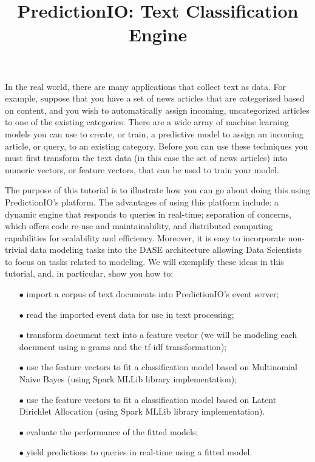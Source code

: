 \documentclass[a4paper,12pt]{article}
\renewcommand{\bf}[1]{\textbf{#1}}
\newcommand{\3}{\left}
\newcommand{\4}{\right}
\renewcommand{\-}[1]{{}^{-#1}}
\begin{document}
\title{\vspace{-1.5 cm}\bf{PredictionIO: Text Classification Engine}}
\author{\vspace{-2cm}}
\date{}
\maketitle


In the real world, there are many applications that collect text as data. For example, suppose that you have a set of news articles that are categorized based on content, and you wish to automatically assign incoming, uncategorized articles to one of the existing categories. There are a wide array of machine learning models you can use to create, or train, a predictive model to assign an incoming article, or query, to an existing category. Before you can use these techniques you must first transform the text data (in this case the set of news articles) into numeric vectors, or feature vectors, that can be used to train your model.

The purpose of this tutorial is to illustrate how you can go about doing this using PredictionIO's platform. The advantages of using this platform include: a dynamic engine that responds to queries in real-time; separation of concerns,
 which offers code re-use and maintainability, and distributed computing capabilities for scalability and efficiency. Moreover, it is easy to incorporate non-trivial data modeling tasks into the DASE architecture allowing Data Scientists to focus on tasks related to modeling. We will exemplify these ideas in this tutorial, and, in particular, show you how to:

\begin{itemize}
\item[$\bullet$]{import a corpus of text documents into PredictionIO's event server;}

\item[$\bullet$]{read the imported event data for use in text processing;}

\item[$\bullet$]{transform document text into a feature vector (we will be modeling each document using n-grams and the tf-idf transformation);}

\item[$\bullet$]{use the feature vectors to fit a classification model based on Multinomial Naive Bayes (using Spark MLLib library implementation);}

\item[$\bullet$]{use the feature vectors to fit a classification model based on Latent Dirichlet Allocation (using Spark MLLib library implementation).}

\item[$\bullet$]{evaluate the performance of the fitted models;}

\item[$\bullet$]{yield predictions to queries in real-time using a fitted model.}
\end{itemize}
\end{document}
